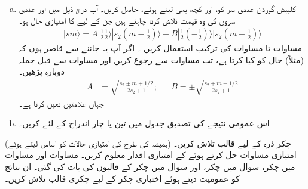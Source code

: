 \begin{enumerate}[a.]
\item    
 کلیبش گورڈن عددی سر   کو،   اور   کچھ بھی لیتے ہوئے،  حاصل کریں۔  آپ درج ذیل میں  اور  عددی سروں کی وہ قیمت تلاش کرنا چاہتے ہیں جن کے لیے    کا امتیازی حال     ہو۔ 
\begin{align*}
    |sm \rangle=A|\tfrac{1}{2}\tfrac{1}{2}\rangle|s_2(m-\tfrac{1}{2})\rangle+B|\tfrac{1}{2}(-\tfrac{1}{2})\rangle|s_2(m+\tfrac{1}{2})\rangle
\end{align*} 
مساوات  تا مساوات   کی ترکیب استعمال کریں ۔ اگر آپ یہ جاننے سے قاصر ہوں
 کہ  (مثلاً)    حال   کو کیا کرتا ہے، تب  مساوات    سے رجوع کریں اور مساوات   سے قبل جملہ دوبارہ پڑھیں۔ 
\begin{align*}
    A&=\sqrt{\frac{s_2\pm m+1/2}{2s_2+1}}; && B=\pm \sqrt{\frac{s_2\mp m+1/2}{2s_2+1}} 
\end{align*}
جہاں    علامتیں تعین کرتا ہے۔
\item 
اس عمومی نتیجے کی تصدیق جدول   میں تین یا چار اندراج   کے لئے  کریں۔
\end{enumerate}
(ہمیشہ کی طرح  کی امتیازی حالات کو اساس لیتے ہوئے)     چکر   ذرہ  کے لیے قالب  تلاش کریں۔ امتیازی مساوات حل کرتے ہوئے  کے  امتیازی اقدار معلوم کریں۔
مساوات    اور مساوات   میں  چکر،   سوال   میں  چکر،  اور سوال   میں  چکر کے قالبوں کی بات کی گئی۔ ان نتائج کو عمومیت دیتے ہوئے اختیاری  چکر کے لیے چکری قالب تلاش کریں۔
